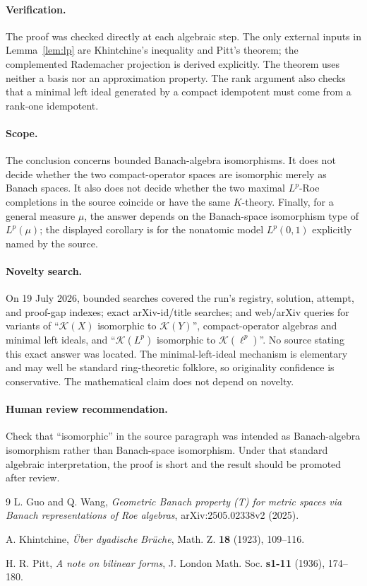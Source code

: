 \documentclass[11pt]{article}
\newcommand{\Kop}{\mathcal K}
\begin{document}
\paragraph{Verification.}
The proof was checked directly at each algebraic step.  The only external
inputs in Lemma~\ref{lem:lp} are Khintchine's inequality and Pitt's theorem;
the complemented Rademacher projection is derived explicitly.  The theorem
uses neither a basis nor an approximation property.  The rank argument also
checks that a minimal left ideal generated by a compact idempotent must come
from a rank-one idempotent.

\paragraph{Scope.}
The conclusion concerns bounded Banach-algebra isomorphisms.  It does not
decide whether the two compact-operator spaces are isomorphic merely as Banach
spaces.  It also does not decide whether the two maximal $L^p$-Roe
completions in the source coincide or have the same $K$-theory.  Finally, for
a general measure $\mu$, the answer depends on the Banach-space isomorphism
type of $L^p(\mu)$; the displayed corollary is for the nonatomic model
$L^p(0,1)$ explicitly named by the source.

\paragraph{Novelty search.}
On 19 July 2026, bounded searches covered the run's registry, solution,
attempt, and proof-gap indexes; exact arXiv-id/title searches; and web/arXiv
queries for variants of ``$\Kop(X)$ isomorphic to $\Kop(Y)$'', compact-operator
algebras and minimal left ideals, and
``$\Kop(L^p)$ isomorphic to $\Kop(\ell^p)$''.  No source stating this exact
answer was located.  The minimal-left-ideal mechanism is elementary and may
well be standard ring-theoretic folklore, so originality confidence is
conservative.  The mathematical claim does not depend on novelty.

\paragraph{Human review recommendation.}
Check that ``isomorphic'' in the source paragraph was intended as
Banach-algebra isomorphism rather than Banach-space isomorphism.  Under that
standard algebraic interpretation, the proof is short and the result should
be promoted after review.

\begin{thebibliography}{9}
L. Guo and Q. Wang,
\emph{Geometric Banach property (T) for metric spaces via Banach
representations of Roe algebras}, arXiv:2505.02338v2 (2025).

A. Khintchine,
\emph{\"Uber dyadische Br\"uche},
Math. Z. \textbf{18} (1923), 109--116.

H. R. Pitt,
\emph{A note on bilinear forms},
J. London Math. Soc. \textbf{s1-11} (1936), 174--180.
\end{thebibliography}
\end{document}
